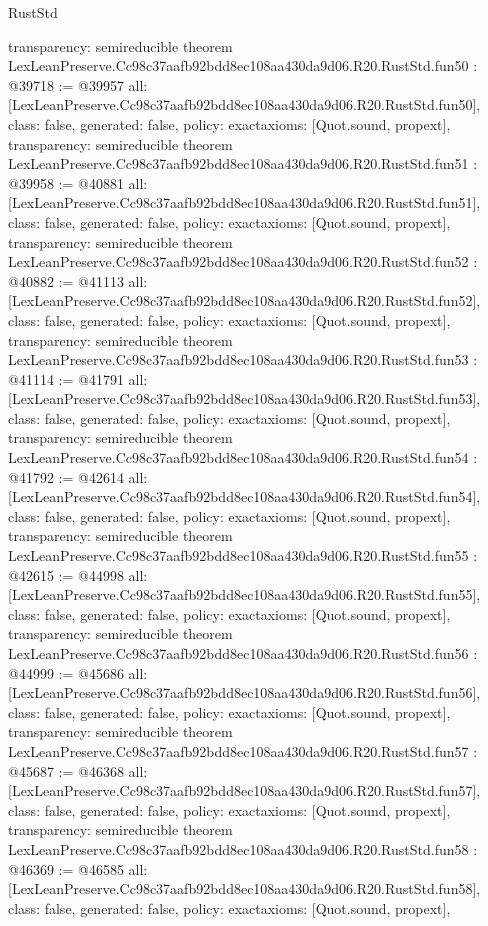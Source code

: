 \begin{lexlean}{RustStd}
\begin{coremodule}
{  transparency: semireducible
}
theorem LexLeanPreserve.Cc98c37aafb92bdd8ec108aa430da9d06.R20.RustStd.fun50 : @39718 := @39957 {
  all: [LexLeanPreserve.Cc98c37aafb92bdd8ec108aa430da9d06.R20.RustStd.fun50],
  class: false,
  generated: false,
  policy: exact{axioms: [Quot.sound, propext]},
  transparency: semireducible
}
theorem LexLeanPreserve.Cc98c37aafb92bdd8ec108aa430da9d06.R20.RustStd.fun51 : @39958 := @40881 {
  all: [LexLeanPreserve.Cc98c37aafb92bdd8ec108aa430da9d06.R20.RustStd.fun51],
  class: false,
  generated: false,
  policy: exact{axioms: [Quot.sound, propext]},
  transparency: semireducible
}
theorem LexLeanPreserve.Cc98c37aafb92bdd8ec108aa430da9d06.R20.RustStd.fun52 : @40882 := @41113 {
  all: [LexLeanPreserve.Cc98c37aafb92bdd8ec108aa430da9d06.R20.RustStd.fun52],
  class: false,
  generated: false,
  policy: exact{axioms: [Quot.sound, propext]},
  transparency: semireducible
}
theorem LexLeanPreserve.Cc98c37aafb92bdd8ec108aa430da9d06.R20.RustStd.fun53 : @41114 := @41791 {
  all: [LexLeanPreserve.Cc98c37aafb92bdd8ec108aa430da9d06.R20.RustStd.fun53],
  class: false,
  generated: false,
  policy: exact{axioms: [Quot.sound, propext]},
  transparency: semireducible
}
theorem LexLeanPreserve.Cc98c37aafb92bdd8ec108aa430da9d06.R20.RustStd.fun54 : @41792 := @42614 {
  all: [LexLeanPreserve.Cc98c37aafb92bdd8ec108aa430da9d06.R20.RustStd.fun54],
  class: false,
  generated: false,
  policy: exact{axioms: [Quot.sound, propext]},
  transparency: semireducible
}
theorem LexLeanPreserve.Cc98c37aafb92bdd8ec108aa430da9d06.R20.RustStd.fun55 : @42615 := @44998 {
  all: [LexLeanPreserve.Cc98c37aafb92bdd8ec108aa430da9d06.R20.RustStd.fun55],
  class: false,
  generated: false,
  policy: exact{axioms: [Quot.sound, propext]},
  transparency: semireducible
}
theorem LexLeanPreserve.Cc98c37aafb92bdd8ec108aa430da9d06.R20.RustStd.fun56 : @44999 := @45686 {
  all: [LexLeanPreserve.Cc98c37aafb92bdd8ec108aa430da9d06.R20.RustStd.fun56],
  class: false,
  generated: false,
  policy: exact{axioms: [Quot.sound, propext]},
  transparency: semireducible
}
theorem LexLeanPreserve.Cc98c37aafb92bdd8ec108aa430da9d06.R20.RustStd.fun57 : @45687 := @46368 {
  all: [LexLeanPreserve.Cc98c37aafb92bdd8ec108aa430da9d06.R20.RustStd.fun57],
  class: false,
  generated: false,
  policy: exact{axioms: [Quot.sound, propext]},
  transparency: semireducible
}
theorem LexLeanPreserve.Cc98c37aafb92bdd8ec108aa430da9d06.R20.RustStd.fun58 : @46369 := @46585 {
  all: [LexLeanPreserve.Cc98c37aafb92bdd8ec108aa430da9d06.R20.RustStd.fun58],
  class: false,
  generated: false,
  policy: exact{axioms: [Quot.sound, propext]},
}
\end{coremodule}
\end{lexlean}
